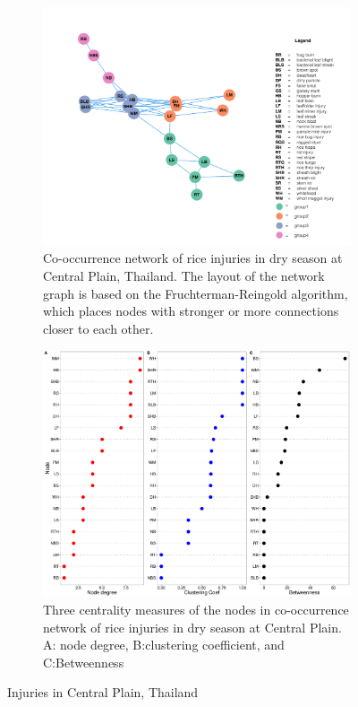 \begin{figure}
    \centering
    \begin{subfigure}[b]{1\textwidth}
        \includegraphics[width = 1\textwidth]{figures/networkCP_ws/networkCP_ws.pdf}
        \caption{Co-occurrence network of rice injuries in dry season at Central Plain, Thailand. The layout of the network graph is based on the Fruchterman-Reingold algorithm, which places nodes with stronger or more connections closer to each other.}
        \label{fig:networkCP_ws}
    \end{subfigure}
    \begin{subfigure}[b]{1\textwidth}
        \includegraphics[width = 1\textwidth]{figures/nodepropCP_ws/nodepropCP_ws.pdf}
        \caption{Three centrality measures of the nodes in co-occurrence network of rice injuries in dry season at Central Plain. A: node degree, B:clustering coefficient, and C:Betweenness}
        \label{fig:nodepropCP_ds}
    \end{subfigure}
    \caption{Injuries in Central Plain, Thailand}
    \label{fig:CP_ws}
\end{figure}

